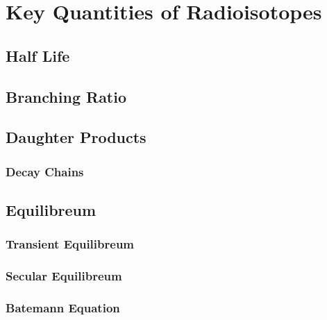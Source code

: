 \chapter{Key Quantities of Radioisotopes}

\section{Half Life}

\section{Branching Ratio}

\section{Daughter Products}
\subsection{Decay Chains}

\section{Equilibreum}
\subsection{Transient Equilibreum}
\subsection{Secular Equilibreum}
\subsection{Batemann Equation}

